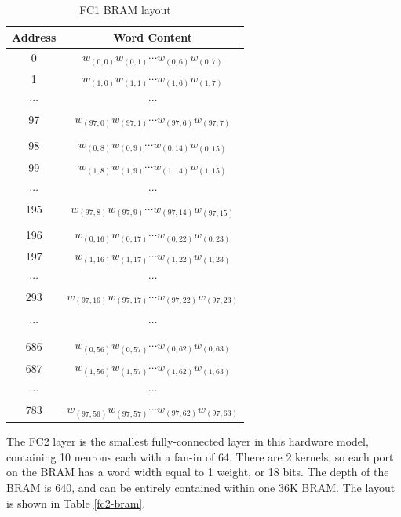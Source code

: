 \begin{table}
	\centering
	\begin{tabular}{|c|c|}
		\hline
		\textbf{Address} & \textbf{Word Content} \\\hline
		0 & $w_{(0, 0)}w_{(0, 1)}\cdots w_{(0, 6)}w_{(0, 7)}$\\
		1 & $w_{(1, 0)}w_{(1, 1)}\cdots w_{(1, 6)}w_{(1, 7)}$\\
		$\cdots$ & $\cdots$ \\
		97 & $w_{(97, 0)}w_{(97, 1)}\cdots w_{(97, 6)}w_{(97, 7)}$\\
		& \\
		98 & $w_{(0, 8)}w_{(0, 9)}\cdots w_{(0, 14)}w_{(0, 15)}$\\		
		99 & $w_{(1, 8)}w_{(1, 9)}\cdots w_{(1, 14)}w_{(1, 15)}$\\
		$\cdots$ & $\cdots$ \\
		195 & $w_{(97, 8)}w_{(97, 9)}\cdots w_{(97, 14)}w_{(97, 15)}$\\	
		& \\	
		196 & $w_{(0, 16)}w_{(0, 17)}\cdots w_{(0, 22)}w_{(0, 23)}$\\		
		197 & $w_{(1, 16)}w_{(1, 17)}\cdots w_{(1, 22)}w_{(1, 23)}$\\
		$\cdots$ & $\cdots$ \\
		293 & $w_{(97, 16)}w_{(97, 17)}\cdots w_{(97, 22)}w_{(97, 23)}$\\	
		& \\
		$\cdots$ & $\cdots$ \\	
		& \\
		686 & $w_{(0, 56)}w_{(0, 57)}\cdots w_{(0, 62)}w_{(0, 63)}$\\		
		687 & $w_{(1, 56)}w_{(1, 57)}\cdots w_{(1, 62)}w_{(1, 63)}$\\
		$\cdots$ & $\cdots$ \\	
		783 & $w_{(97, 56)}w_{(97, 57)}\cdots w_{(97, 62)}w_{(97, 63)}$\\
		\hline
	\end{tabular}	
	\caption{FC1 BRAM layout}	
	\label{fc1-bram}
\end{table}

The FC2 layer is the smallest fully-connected layer in this hardware model, containing 10 neurons each with a fan-in of 64. There are 2 kernels, so each port on the BRAM has a word width equal to 1 weight, or 18 bits. The depth of the BRAM is 640, and can be entirely contained within one 36K BRAM. The layout is shown in Table \ref{fc2-bram}.

